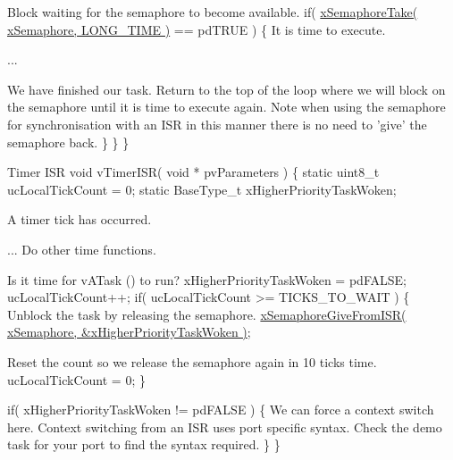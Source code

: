 \begin{DoxyPre}Block waiting for the semaphore to become available.
        if( \hyperlink{semphr_8h_af116e436d2a5ae5bd72dbade2b5ea930}{xSemaphoreTake( xSemaphore, LONG\_TIME )} == pdTRUE )
        \{
It is time to execute.\end{DoxyPre}



\begin{DoxyPre}...\end{DoxyPre}



\begin{DoxyPre}We have finished our task.  Return to the top of the loop where
we will block on the semaphore until it is time to execute
again.  Note when using the semaphore for synchronisation with an
ISR in this manner there is no need to 'give' the semaphore back.
        \}
    \}
 \}\end{DoxyPre}



\begin{DoxyPre}Timer ISR
 void vTimerISR( void * pvParameters )
 \{
 static uint8\_t ucLocalTickCount = 0;
 static BaseType\_t xHigherPriorityTaskWoken;\end{DoxyPre}



\begin{DoxyPre}A timer tick has occurred.\end{DoxyPre}



\begin{DoxyPre}... Do other time functions.\end{DoxyPre}



\begin{DoxyPre}Is it time for vATask () to run?
    xHigherPriorityTaskWoken = pdFALSE;
    ucLocalTickCount++;
    if( ucLocalTickCount >= TICKS\_TO\_WAIT )
    \{
Unblock the task by releasing the semaphore.
        \hyperlink{semphr_8h_a68aa43df8b2a0dbe17d05fad74670ef0}{xSemaphoreGiveFromISR( xSemaphore, &xHigherPriorityTaskWoken )};\end{DoxyPre}



\begin{DoxyPre}Reset the count so we release the semaphore again in 10 ticks time.
        ucLocalTickCount = 0;
    \}\end{DoxyPre}



\begin{DoxyPre}    if( xHigherPriorityTaskWoken != pdFALSE )
    \{
We can force a context switch here.  Context switching from an
ISR uses port specific syntax.  Check the demo task for your port
to find the syntax required.
    \}
 \}
 \end{DoxyPre}
 